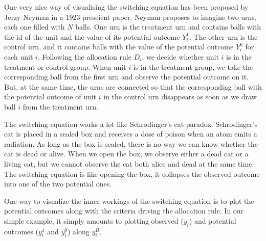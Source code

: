 \documentclass[]{book}
\theoremstyle{definition}
\theoremstyle{definition}
\theoremstyle{definition}
\theoremstyle{remark}
\let\BeginKnitrBlock\begin \let\EndKnitrBlock\end
\begin{document}
\BeginKnitrBlock{remark}
\iffalse{} {Remark. } \fi{}One very nice way of visualising the
switching equation has been proposed by Jerzy Neyman in a 1923 prescient
paper. Neyman proposes to imagine two urns, each one filled with \(N\)
balls. One urn is the treatment urn and contains balls with the id of
the unit and the value of its potential outcome \(Y_i^1\). The other urn
is the control urn, and it contains balls with the value of the
potential outcome \(Y_i^0\) for each unit \(i\). Following the
allocation rule \(D_i\), we decide whether unit \(i\) is in the
treatment or control group. When unit \(i\) is in the treatment group,
we take the corresponding ball from the first urn and observe the
potential outcome on it. But, at the same time, the urns are connected
so that the corresponding ball with the potential outcome of unit \(i\)
in the control urn disappears as soon as we draw ball \(i\) from the
treatment urn.

The switching equation works a lot like Schrodinger's cat paradox.
Schrodinger's cat is placed in a sealed box and receives a dose of
poison when an atom emits a radiation. As long as the box is sealed,
there is no way we can know whether the cat is dead or alive. When we
open the box, we observe either a dead cat or a living cat, but we
cannot observe the cat both alice and dead at the same time. The
switching equation is like opening the box, it collapses the observed
outcome into one of the two potential ones.
\EndKnitrBlock{remark}

\BeginKnitrBlock{example}
\protect\hypertarget{exm:unnamed-chunk-6}{}{\label{exm:unnamed-chunk-6} }One
way to visualize the inner workings of the switching equation is to plot
the potential outcomes along with the criteria driving the allocation
rule. In our simple example, it simply amounts to plotting observed
(\(y_i\)) and potential outcomes (\(y_i^1\) and \(y_i^0\)) along
\(y_i^B\).
\EndKnitrBlock{example}
\end{document}
